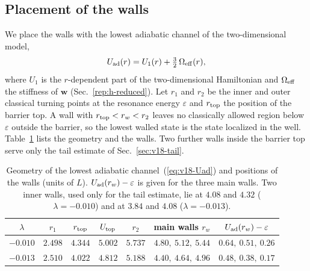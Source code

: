 \subsection{Placement of the walls}\label{sec:v18-walls}

We place the walls with the lowest adiabatic channel of the two-dimensional model,
\begin{equation}
U_{\rm ad}(r)=U_1(r)+\tfrac32\,\Omega_{\rm eff}(r),
\label{eq:v18-Uad}
\end{equation}
where $U_1$ is the $r$-dependent part of the two-dimensional Hamiltonian and $\Omega_{\rm eff}$ the stiffness of $\bm w$ (Sec.~\ref{rep:h-reduced}).
Let $r_1$ and $r_2$ be the inner and outer classical turning points at the resonance energy $\varepsilon$ and $r_{\rm top}$ the position of the barrier top.
A wall with $r_{\rm top}<r_w<r_2$ leaves no classically allowed region below $\varepsilon$ outside the barrier, so the lowest walled state is the state localized in the well.
Table~\ref{tab:v18-walls} lists the geometry and the walls.
Two further walls inside the barrier top serve only the tail estimate of Sec.~\ref{sec:v18-tail}.

\begin{table}[t]
\centering
\caption{Geometry of the lowest adiabatic channel~(\ref{eq:v18-Uad}) and positions of the walls (units of $L$). $U_{\rm ad}(r_w)-\varepsilon$ is given for the three main walls. Two inner walls, used only for the tail estimate, lie at $4.08$ and $4.32$ ($\lambda=-0.010$) and at $3.84$ and $4.08$ ($\lambda=-0.013$).}
\label{tab:v18-walls}
\begin{tabular}{ccccccc}
\toprule
$\lambda$ & $r_1$ & $r_{\rm top}$ & $U_{\rm top}$ & $r_2$ & main walls $r_w$ & $U_{\rm ad}(r_w)-\varepsilon$ \\
\midrule
$-0.010$ & $2.498$ & $4.344$ & $5.002$ & $5.737$ & $4.80,\ 5.12,\ 5.44$ & $0.64,\ 0.51,\ 0.26$ \\ %
$-0.013$ & $2.510$ & $4.022$ & $4.812$ & $5.188$ & $4.40,\ 4.64,\ 4.96$ & $0.48,\ 0.38,\ 0.17$ \\ %
\bottomrule
\end{tabular}
\end{table}

